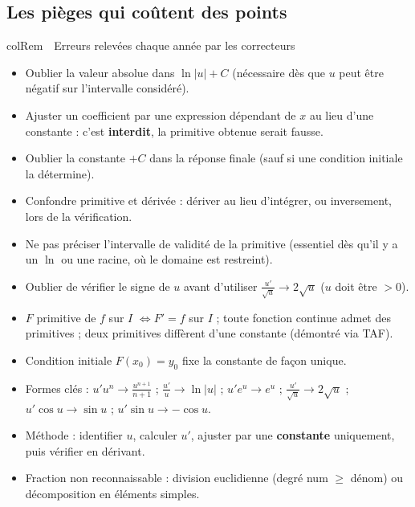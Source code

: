 \documentclass[11pt,a4paper]{article}
\newenvironment{remarque}[1][Remarque]
  {\begin{fiche}{colRem}{\ding{43}~~#1}}{\end{fiche}}
\begin{document}
\subsection{Les pièges qui coûtent des points}

\begin{remarque}[Erreurs relevées chaque année par les correcteurs]
\begin{itemize}[leftmargin=6mm, itemsep=0.5mm]
  \item Oublier la valeur absolue dans $\ln|u|+C$ (nécessaire dès que $u$ peut être négatif sur l'intervalle considéré).
  \item Ajuster un coefficient par une expression dépendant de $x$ au lieu d'une constante : c'est \textbf{interdit}, la primitive obtenue serait fausse.
  \item Oublier la constante $+C$ dans la réponse finale (sauf si une condition initiale la détermine).
  \item Confondre primitive et dérivée : dériver au lieu d'intégrer, ou inversement, lors de la vérification.
  \item Ne pas préciser l'intervalle de validité de la primitive (essentiel dès qu'il y a un $\ln$ ou une racine, où le domaine est restreint).
  \item Oublier de vérifier le signe de $u$ avant d'utiliser $\frac{u'}{\sqrt u}\to 2\sqrt u$ ($u$ doit être $>0$).
\end{itemize}
\end{remarque}

\vspace{4mm}
\begin{tcolorbox}[
  enhanced, boxrule=0pt, arc=2mm,
  interior style={left color=qtealdark, right color=qteal},
  left=6mm, right=6mm, top=4mm, bottom=4mm,
  fontupper=\color{white}\sffamily,
  title={\sffamily\bfseries\color{white}\ding{72}~~À retenir},
  colbacktitle=qtealdark, coltitle=white, boxrule=0pt
]
\begin{itemize}[leftmargin=6mm, label={\color{qamber}}, itemsep=1mm]
  \item $F$ primitive de $f$ sur $I$ $\iff F'=f$ sur $I$ ; toute fonction continue admet des primitives ; deux primitives diffèrent d'une constante (démontré via TAF).
  \item Condition initiale $F(x_0)=y_0$ fixe la constante de façon unique.
  \item Formes clés : $u'u^n\to\frac{u^{n+1}}{n+1}$ ; $\frac{u'}{u}\to\ln|u|$ ; $u'e^u\to e^u$ ; $\frac{u'}{\sqrt u}\to2\sqrt u$ ; $u'\cos u\to\sin u$ ; $u'\sin u\to-\cos u$.
  \item Méthode : identifier $u$, calculer $u'$, ajuster par une \textbf{constante} uniquement, puis vérifier en dérivant.
  \item Fraction non reconnaissable : division euclidienne (degré num $\geq$ dénom) ou décomposition en éléments simples.
\end{itemize}
\end{tcolorbox}
\end{document}
